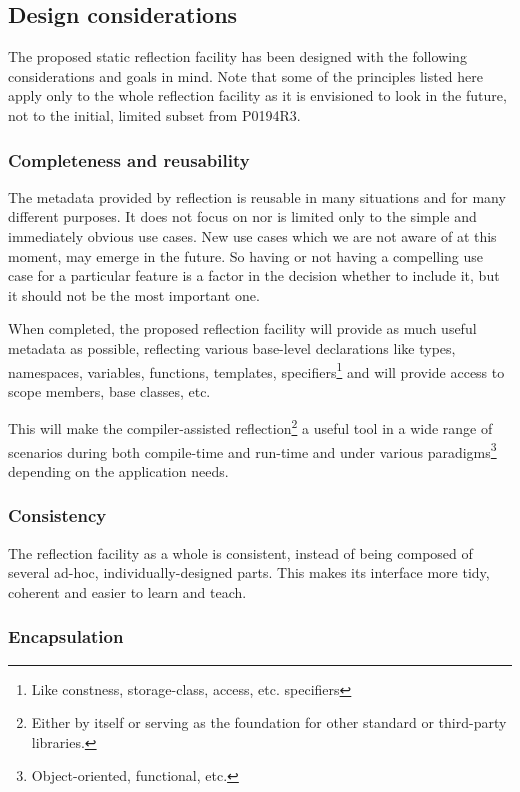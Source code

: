 \subsection{Design considerations}
\label{design-prefs}

The proposed static reflection facility has been designed with the following
considerations and goals in mind. 
Note that some of the principles listed here
apply only to the whole reflection facility as it is envisioned
to look in the future, not to the initial, limited subset from P0194R3.

\subsubsection{Completeness and reusability}
\label{design-completeness}

The metadata provided by reflection is reusable in many situations
and for many different purposes.
It does not focus on nor is limited only to the simple and immediately obvious
use cases. New use cases which we are not aware of at this moment, may emerge
in the future. So having or not having a compelling use case for a particular
feature is a factor in the decision whether to include it, but it should
not be the most important one.

When completed, the proposed reflection facility will provide as much useful
metadata as possible, reflecting various base-level
declarations like types, namespaces, variables, functions, templates,
specifiers\footnote{Like constness, storage-class, access, etc. specifiers} and
will provide access to scope members, base classes, etc.

This will make the compiler-assisted reflection\footnote{Either by itself or
serving as the foundation for other standard or third-party libraries.} a useful
tool in a wide range of scenarios during both compile-time
and run-time and under various paradigms\footnote{Object-oriented, functional,
etc.} depending on the application needs.

\subsubsection{Consistency}
\label{design-consistency}

The reflection facility as a whole is consistent, instead of being
composed of several ad-hoc, individually-designed parts. This makes
its interface more tidy, coherent and easier to learn and teach.

\subsubsection{Encapsulation}
\label{design-encapsulation}

